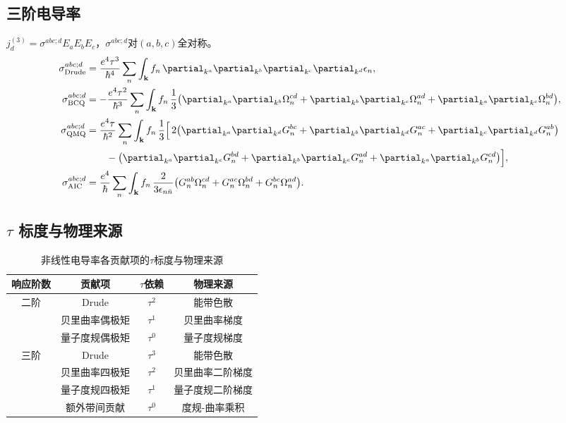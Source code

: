 \subsection{三阶电导率}
$j_d^{(3)} = \sigma^{abc;d}E_a E_b E_c$，$\sigma^{abc;d}$对$(a,b,c)$全对称。
\begin{align}
\sigma_{\text{Drude}}^{abc;d} &= \frac{e^4\tau^3}{\hbar^4}\sum_n\int_{\mathbf{k}} f_n\,\partial_{k^a}\partial_{k^b}\partial_{k^c}\partial_{k^d}\epsilon_n, \label{eq:sigma3_Drude}\\
\sigma_{\text{BCQ}}^{abc;d} &= -\frac{e^4\tau^2}{\hbar^3}\sum_n\int_{\mathbf{k}} f_n\,
\frac{1}{3}\bigl(\partial_{k^a}\partial_{k^b}\Omega_n^{cd} + \partial_{k^b}\partial_{k^c}\Omega_n^{ad} + \partial_{k^a}\partial_{k^c}\Omega_n^{bd}\bigr), \label{eq:sigma3_BCQ}\\
\sigma_{\text{QMQ}}^{abc;d} &= \frac{e^4\tau}{\hbar^2}\sum_n\int_{\mathbf{k}} f_n\,
\frac{1}{3}\Bigl[\,2\bigl(\partial_{k^a}\partial_{k^d}G_n^{bc}+\partial_{k^b}\partial_{k^d}G_n^{ac}+\partial_{k^c}\partial_{k^d}G_n^{ab}\bigr) \nonumber\\
&\qquad -\bigl(\partial_{k^a}\partial_{k^c}G_n^{bd}+\partial_{k^b}\partial_{k^c}G_n^{ad}+\partial_{k^a}\partial_{k^b}G_n^{cd}\bigr)\Bigr], \label{eq:sigma3_QMQ}\\
\sigma_{\text{AIC}}^{abc;d} &= \frac{e^4}{\hbar}\sum_n\int_{\mathbf{k}} f_n\,
\frac{2}{3\epsilon_{n\bar{n}}}\bigl(G_n^{ab}\Omega_n^{cd}+G_n^{ac}\Omega_n^{bd}+G_n^{bc}\Omega_n^{ad}\bigr). \label{eq:sigma3_AIC}
\end{align}

\subsection{$\tau$ 标度与物理来源}
\begin{table}[H]
\centering
\caption{非线性电导率各贡献项的$\tau$标度与物理来源}
\label{tab:tau_scaling}
\begin{tabular}{c|c|c|c}
\toprule
响应阶数 & 贡献项 & $\tau$依赖 & 物理来源 \\
\midrule
\multirow{3}{*}{二阶} & Drude & $\tau^2$ & 能带色散 \\
                      & 贝里曲率偶极矩 & $\tau^1$ & 贝里曲率梯度 \\
                      & 量子度规偶极矩 & $\tau^0$ & 量子度规梯度 \\
\midrule
\multirow{4}{*}{三阶} & Drude & $\tau^3$ & 能带色散 \\
                      & 贝里曲率四极矩 & $\tau^2$ & 贝里曲率二阶梯度 \\
                      & 量子度规四极矩 & $\tau^1$ & 量子度规二阶梯度 \\
                      & 额外带间贡献 & $\tau^0$ & 度规-曲率乘积 \\
\bottomrule
\end{tabular}
\end{table}
